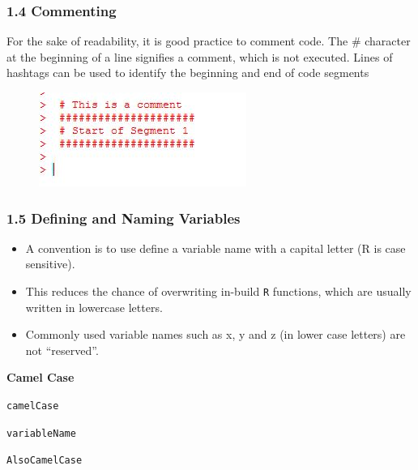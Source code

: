 \documentclass{beamer}
\begin{document}
 	\begin{frame}
 		\frametitle{1.4 Commenting}
 		For the sake of readability, it is good practice to comment code. The \# character at the
 		beginning of a line signifies a comment, which is not executed. Lines of hashtags can be used
 		to identify the beginning and end of code segments
 		\begin{figure}
 			\centering
 			\includegraphics[width=1.2\linewidth]{images/commenting}
 		\end{figure}
 		
 	\end{frame}
 	\begin{frame}
 		\frametitle{1.5 Defining and Naming Variables}
 		\begin{itemize}
 			\item A convention is to use define a variable name with a capital letter (R is case sensitive). 
 			\item This
 			reduces the chance of overwriting in-build \texttt{R} functions, which are usually written in lowercase
 			letters. 
 			\item Commonly used variable names such as x, y and z (in lower case letters) are not “reserved”.
 		\end{itemize}
 		\textbf{Camel Case}
 		\begin{framed}
 			\texttt{camelCase}
 			
 			\texttt{variableName}
 			
 			\texttt{AlsoCamelCase}
 		\end{framed}
 	\end{frame}
\end{document}
